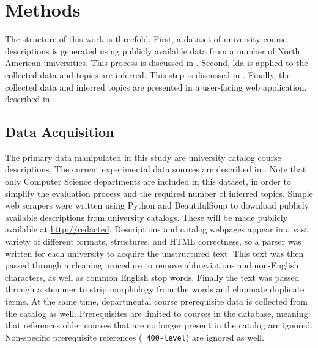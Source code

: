 \section{Methods}
\label{sec:methods}


The structure of this work is threefold.
First, a dataset of university course descriptions is generated using publicly available data from a number of North American universities.
This process is discussed in .
Second, \ac{lda} is applied to the collected data and topics are inferred.
This step is discussed in .
Finally, the collected data and inferred topics are presented in a user-facing web application, described in .


\subsection{Data Acquisition}
\label{sec:data-acquisition}


The primary data manipulated in this study are university catalog course descriptions.
The current experimental data sources are described in .
Note that only Computer Science departments are included in this dataset, in order to simplify the evaluation process and the required number of inferred topics.
Simple web scrapers were written using Python and BeautifulSoup to download publicly available descriptions from university catalogs.
These will be made publicly available at
\url{http://redacted}.
Descriptions and catalog webpages appear in a vast variety of different formats, structures, and HTML correctness, so a parser was written for each university to acquire the unstructured text.
This text was then passed through a cleaning procedure to remove abbreviations and non-English characters, as well as common English stop words.
Finally the text was passed through a stemmer to strip morphology from the words and eliminate duplicate terms.
At the same time, departmental course prerequisite data is collected from the catalog as well.
Prerequisites are limited to courses in the database, meaning that references older courses that are no longer present in the catalog are ignored.
Non-specific prerequisite references (\eg\ \texttt{400-level}) are ignored as well.


